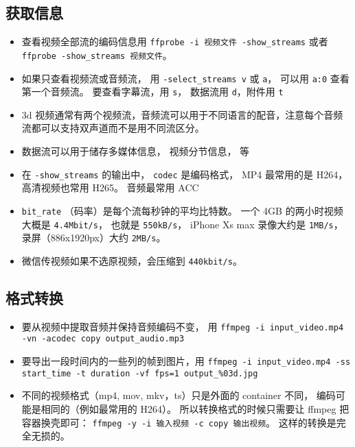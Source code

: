 
\begin{issues}
\issueDraft
\end{issues}

\subsection{获取信息}
\begin{itemize}
\item 查看视频全部流的编码信息用 \verb|ffprobe -i 视频文件 -show_streams| 或者 \verb|ffprobe -show_streams 视频文件|。
\item 如果只查看视频流或音频流， 用 \verb|-select_streams v| 或 \verb|a|， 可以用 \verb|a:0| 查看第一个音频流。 要查看字幕流，用 \verb|s|， 数据流用 \verb|d|，附件用 \verb|t|
\item 3d 视频通常有两个视频流，音频流可以用于不同语言的配音，注意每个音频流都可以支持双声道而不是用不同流区分。
\item 数据流可以用于储存多媒体信息， 视频分节信息， 等
\item 在 \verb|-show_streams| 的输出中， \verb|codec| 是编码格式， MP4 最常用的是 H264， 高清视频也常用 H265。 音频最常用 ACC
\item \verb|bit_rate| （码率）是每个流每秒钟的平均比特数。 一个 4GB 的两小时视频大概是 \verb|4.4Mbit/s|， 也就是 \verb|550kB/s|， iPhone Xs max 录像大约是 \verb|1MB/s|， 录屏（886x1920px）大约 \verb|2MB/s|。
\item 微信传视频如果不选原视频，会压缩到 \verb|440kbit/s|。
\end{itemize}

\subsection{格式转换}
\begin{itemize}
\item 要从视频中提取音频并保持音频编码不变， 用 \verb|ffmpeg -i input_video.mp4 -vn -acodec copy output_audio.mp3|
\item 要导出一段时间内的一些列的帧到图片，用 \verb|ffmpeg -i input_video.mp4 -ss start_time -t duration -vf fps=1 output_%03d.jpg|
\item 不同的视频格式（mp4, mov, mkv，ts）只是外面的 container 不同， 编码可能是相同的（例如最常用的 H264）。 所以转换格式的时候只需要让 ffmpeg 把容器换壳即可： \verb|ffmpeg -y -i 输入视频 -c copy 输出视频|。 这样的转换是完全无损的。
\end{itemize}

